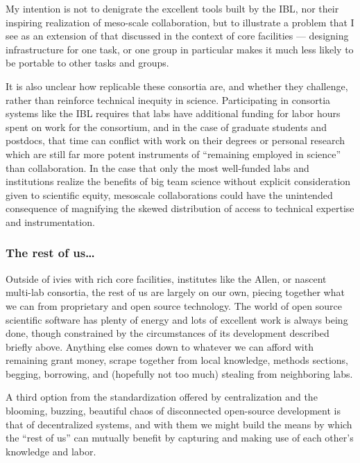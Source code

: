 \documentclass[10pt]{article}
\begin{document}
\begin{multicols}{2}
My intention is not to denigrate the excellent tools built by the IBL,
nor their inspiring realization of meso-scale collaboration, but to
illustrate a problem that I see as an extension of that discussed in the
context of core facilities --- designing infrastructure for one task, or
one group in particular makes it much less likely to be portable to
other tasks and groups.

It is also unclear how replicable these consortia are, and whether they
challenge, rather than reinforce technical inequity in science.
Participating in consortia systems like the IBL requires that labs have
additional funding for labor hours spent on work for the consortium, and
in the case of graduate students and postdocs, that time can conflict
with work on their degrees or personal research which are still far more
potent instruments of ``remaining employed in science'' than
collaboration. In the case that only the most well-funded labs and
institutions realize the benefits of big team science without explicit
consideration given to scientific equity, mesoscale collaborations could
have the unintended consequence of magnifying the skewed distribution of
access to technical expertise and instrumentation.

\hypertarget{the-rest-of-us}{%
\subsubsection{The rest of us\ldots{}}\label{the-rest-of-us}}

Outside of ivies with rich core facilities, institutes like the Allen,
or nascent multi-lab consortia, the rest of us are largely on our own,
piecing together what we can from proprietary and open source
technology. The world of open source scientific software has plenty of
energy and lots of excellent work is always being done, though
constrained by the circumstances of its development described briefly
above. Anything else comes down to whatever we can afford with remaining
grant money, scrape together from local knowledge, methods sections,
begging, borrowing, and (hopefully not too much) stealing from
neighboring labs.

A third option from the standardization offered by centralization and
the blooming, buzzing, beautiful chaos of disconnected open-source
development is that of decentralized systems, and with them we might
build the means by which the ``rest of us'' can mutually benefit by
capturing and making use of each other's knowledge and labor.

\end{multicols}
\end{document}
